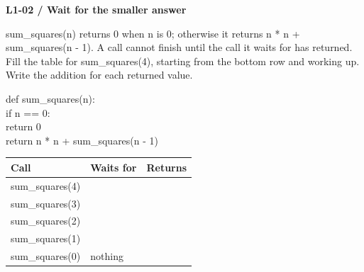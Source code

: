 \documentclass[11pt,a4paper]{article}
\begin{document}
\par\noindent\begin{minipage}{\linewidth}
\textbf{L1-02 / Wait for the smaller answer}\par\smallskip sum\_squares(n) returns 0 when n is 0; otherwise it returns n * n + sum\_squares(n - 1). A call cannot finish until the call it waits for has returned. Fill the table for sum\_squares(4), starting from the bottom row and working up. Write the addition for each returned value.\par
\par\smallskip\noindent\colorbox{codepaper}{\parbox{\dimexpr\linewidth-2\fboxsep\relax}{\small\ttfamily\raggedright def sum\_squares(n):\\\hspace*{2.4em}if n == 0:\\\hspace*{4.8em}return 0\\\hspace*{2.4em}return n * n + sum\_squares(n - 1)}}\par
\par\smallskip \begingroup\small\setlength{\tabcolsep}{4pt}\renewcommand{\arraystretch}{1.35}\begin{tabularx}{\linewidth}{>{\raggedright\arraybackslash}X>{\raggedright\arraybackslash}X>{\raggedright\arraybackslash}X}\toprule\textbf{Call} & \textbf{Waits for} & \textbf{Returns}\\\midrule
sum\_squares(4) &  & \\
sum\_squares(3) &  & \\
sum\_squares(2) &  & \\
sum\_squares(1) &  & \\
sum\_squares(0) & nothing & 0\\
\bottomrule\end{tabularx}\endgroup\par\smallskip 
\end{minipage}\par\vspace{2mm}
\end{document}

